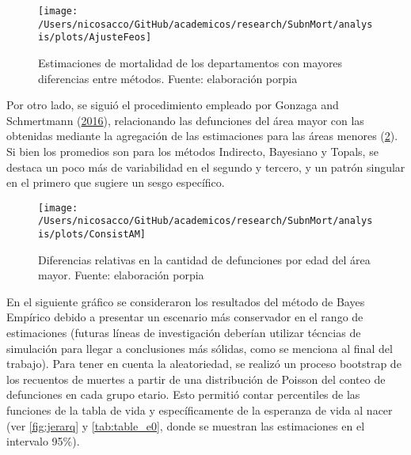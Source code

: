 \documentclass[12pt,]{article}
\begin{document}
\begin{figure}

{\centering \texttt{[image: /Users/nicosacco/GitHub/academicos/research/SubnMort/analysis/plots/AjusteFeos]} 

}

\caption{Estimaciones de mortalidad de los departamentos con mayores diferencias entre métodos. Fuente: elaboración porpia}\label{fig:Feos}
\end{figure}

Por otro lado, se siguió el procedimiento empleado por Gonzaga and
Schmertmann (\protect\hyperlink{ref-Gonzaga_Schmertmann_2016}{2016}),
relacionando las defunciones del área mayor con las obtenidas mediante
la agregación de las estimaciones para las áreas menores
(\ref{fig:consistAM}). Si bien los promedios son para los métodos
Indirecto, Bayesiano y Topals, se destaca un poco más de variabilidad en
el segundo y tercero, y un patrón singular en el primero que sugiere un
sesgo específico.

\begin{figure}

{\centering \texttt{[image: /Users/nicosacco/GitHub/academicos/research/SubnMort/analysis/plots/ConsistAM]} 

}

\caption{Diferencias relativas en la cantidad de defunciones por edad del área mayor. Fuente: elaboración porpia}\label{fig:consistAM}
\end{figure}

En el siguiente gráfico se consideraron los resultados del método de
Bayes Empírico debido a presentar un escenario más conservador en el
rango de estimaciones (futuras líneas de investigación deberían utilizar
técncias de simulación para llegar a conclusiones más sólidas, como se
menciona al final del trabajo). Para tener en cuenta la aleatoriedad, se
realizó un proceso bootstrap de los recuentos de muertes a partir de una
distribución de Poisson del conteo de defunciones en cada grupo etario.
Esto permitió contar percentiles de las funciones de la tabla de vida y
específicamente de la esperanza de vida al nacer (ver \ref{fig:jerarq} y
\ref{tab:table_e0}, donde se muestran las estimaciones en el intervalo
95\%).
\end{document}
